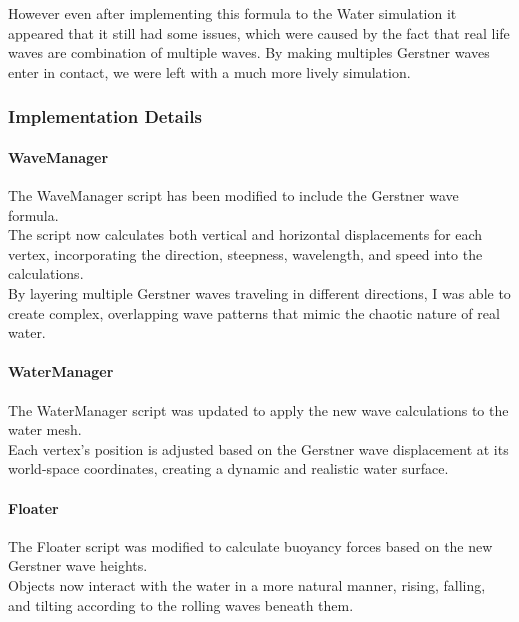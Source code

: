 \documentclass{article}
\begin{document}
However even after implementing this formula to the Water simulation it appeared that it still had some issues, which were caused by the fact that real life waves are combination of multiple waves. By making multiples Gerstner waves enter in contact, we were left with a much more lively simulation.



\subsubsection{Implementation Details}

\paragraph{WaveManager}\hfill

The WaveManager script has been modified to include the Gerstner wave formula.\\

The script now calculates both vertical and horizontal displacements for each vertex, incorporating the direction, steepness, wavelength, and speed into the calculations.\\

By layering multiple Gerstner waves traveling in different directions, I was able to create complex, overlapping wave patterns that mimic the chaotic nature of real water.

\paragraph{WaterManager}\hfill

The WaterManager script was updated to apply the new wave calculations to the water mesh.\\

Each vertex's position is adjusted based on the Gerstner wave displacement at its world-space coordinates, creating a dynamic and realistic water surface.

\paragraph{Floater}\hfill

The Floater script was modified to calculate buoyancy forces based on the new Gerstner wave heights.\\

Objects now interact with the water in a more natural manner, rising, falling, and tilting according to the rolling waves beneath them.
\end{document}
